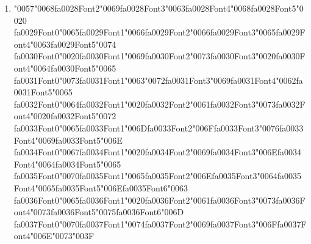 \documentclass[12pt]{article}
\begin{document}
\begin{enumerate}[label=Q\arabic*.]
 \begin{enumerate}[label=(\Alph*)]
     \item The hidden state has fixed dimensionality
     \item They reuse identical parameters at every time step
     \item Gradients decay or explode during backpropagation
     \item They produce outputs only at the final step
 \end{enumerate}
 
 \item {\char"0057}{\char"0068}{\csname fa0028Font2\endcsname\char"0069}{\csname fa0028Font3\endcsname\char"0063}{\csname fa0028Font4\endcsname\char"0068}{\csname fa0028Font5\endcsname\char"0020} {\csname fa0029Font0\endcsname\char"0065}{\csname fa0029Font1\endcsname\char"0066}{\csname fa0029Font2\endcsname\char"0066}{\csname fa0029Font3\endcsname\char"0065}{\csname fa0029Font4\endcsname\char"0063}{\csname fa0029Font5\endcsname\char"0074} {\csname fa0030Font0\endcsname\char"0020}{\csname fa0030Font1\endcsname\char"0069}{\csname fa0030Font2\endcsname\char"0073}{\csname fa0030Font3\endcsname\char"0020}{\csname fa0030Font4\endcsname\char"0064}{\csname fa0030Font5\endcsname\char"0065} {\csname fa0031Font0\endcsname\char"0073}{\csname fa0031Font1\endcsname\char"0063}{\char"0072}{\csname fa0031Font3\endcsname\char"0069}{\csname fa0031Font4\endcsname\char"0062}{\csname fa0031Font5\endcsname\char"0065} {\csname fa0032Font0\endcsname\char"0064}{\csname fa0032Font1\endcsname\char"0020}{\csname fa0032Font2\endcsname\char"0061}{\csname fa0032Font3\endcsname\char"0073}{\csname fa0032Font4\endcsname\char"0020}{\csname fa0032Font5\endcsname\char"0072} {\csname fa0033Font0\endcsname\char"0065}{\csname fa0033Font1\endcsname\char"006D}{\csname fa0033Font2\endcsname\char"006F}{\csname fa0033Font3\endcsname\char"0076}{\csname fa0033Font4\endcsname\char"0069}{\csname fa0033Font5\endcsname\char"006E} {\csname fa0034Font0\endcsname\char"0067}{\csname fa0034Font1\endcsname\char"0020}{\csname fa0034Font2\endcsname\char"0069}{\csname fa0034Font3\endcsname\char"006E}{\csname fa0034Font4\endcsname\char"0064}{\csname fa0034Font5\endcsname\char"0065} {\csname fa0035Font0\endcsname\char"0070}{\csname fa0035Font1\endcsname\char"0065}{\csname fa0035Font2\endcsname\char"006E}{\csname fa0035Font3\endcsname\char"0064}{\csname fa0035Font4\endcsname\char"0065}{\csname fa0035Font5\endcsname\char"006E}{\csname fa0035Font6\endcsname\char"0063} {\csname fa0036Font0\endcsname\char"0065}{\csname fa0036Font1\endcsname\char"0020}{\csname fa0036Font2\endcsname\char"0061}{\csname fa0036Font3\endcsname\char"0073}{\csname fa0036Font4\endcsname\char"0073}{\csname fa0036Font5\endcsname\char"0075}{\csname fa0036Font6\endcsname\char"006D} {\csname fa0037Font0\endcsname\char"0070}{\csname fa0037Font1\endcsname\char"0074}{\csname fa0037Font2\endcsname\char"0069}{\csname fa0037Font3\endcsname\char"006F}{\csname fa0037Font4\endcsname\char"006E}{\char"0073}{\char"003F}

\end{enumerate}
\end{document}
